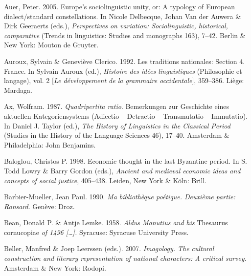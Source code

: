 \begin{styleStandard}
Auer, Peter. 2005. Europe’s sociolinguistic unity, or: A typology of European dialect/standard constellations. In Nicole Delbecque, Johan Van der Auwera \& Dirk Geeraerts (eds.), \textit{Perspectives on variation: Sociolinguistic, historical, comparative} (Trends in linguistics: Studies and monographs 163), 7–42. Berlin \& New York: Mouton de Gruyter.
\end{styleStandard}

\begin{styleStandard}
Auroux, Sylvain \& Geneviève Clerico. 1992. Les traditions nationales: Section 4. France. In Sylvain Auroux (ed.), \textit{Histoire des idées linguistiques} (Philosophie et langage), vol. 2 [\textit{Le développement de la grammaire occidentale}], 359–386. Liège: Mardaga.
\end{styleStandard}

\begin{styleStandard}
Ax, Wolfram. 1987. \textit{Quadripertita ratio}. Bemerkungen zur Geschichte eines aktuellen Kategoriensystems (Adiectio – Detractio – Transmutatio – Immutatio). In Daniel J. Taylor (ed.), \textit{The History of Linguistics in the Classical Period} (Studies in the History of the Language Sciences 46), 17–40. Amsterdam \& Philadelphia: John Benjamins.
\end{styleStandard}

\begin{styleStandard}
Baloglou, Christos P. 1998. Economic thought in the last Byzantine period. In S. Todd Lowry \& Barry Gordon (eds.), \textit{Ancient and medieval economic ideas and concepts of social justice}, 405–438. Leiden, New York \& Köln: Brill.
\end{styleStandard}

\begin{styleStandard}
Barbier-Mueller, Jean Paul. 1990. \textit{Ma bibliothèque poétique. Deuxième partie: Ronsard}. Genève: Droz.
\end{styleStandard}

\begin{styleStandard}
Bean, Donald P. \& Antje Lemke. 1958. \textit{Aldus Manutius and his }Thesaurus cornucopiae\textit{ of 1496 […]. }Syracuse: Syracuse University Press.
\end{styleStandard}

\begin{styleStandard}
Beller, Manfred \& Joep Leerssen (eds.). 2007. \textit{Imagology. The cultural construction and literary representation of national characters: A critical survey}. Amsterdam \& New York: Rodopi.
\end{styleStandard}

